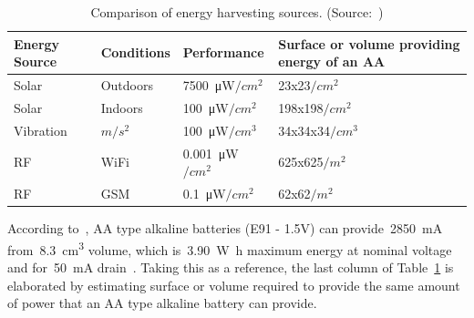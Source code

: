 \documentclass[12pt, oneandhalf, chaparabic, sees, ms]{metu}
\begin{document}
\renewcommand{\arraystretch}{1}%
\begin{table}[H]
\begin{center}
\caption{Comparison of energy harvesting sources. (Source:~\cite{akbari2014})}
\label{tab:harvesting-sources}
\begin{adjustbox}{max width=\textwidth}
\begin{tabular}{| >{\centering}m{3cm} | >{\centering}m{3cm} | >{\centering}m{3cm} | >{\centering}m{4cm} |}
\hline
\rowcolor{lightgray}
\textbf{Energy Source} & \textbf{Conditions} & \textbf{Performance} & \textbf{Surface or volume providing energy of an AA} \tabularnewline
\hline \hline
Solar     & Outdoors &  \SI{7500}{\micro\watt}$/cm^2$  &  23x23$/cm^2$    \tabularnewline \hline
Solar     & Indoors  &  \SI{100}{\micro\watt}$/cm^2$   &  198x198$/cm^2$  \tabularnewline \hline
Vibration & 1$m/s^2$ &  \SI{100}{\micro\watt}$/cm^3$   &  34x34x34$/cm^3$ \tabularnewline \hline 
RF        & WiFi     &  \SI{0.001}{\micro\watt}$/cm^2$ &  625x625$/m^2$   \tabularnewline \hline
RF        & GSM      &  \SI{0.1}{\micro\watt}$/cm^2$   &  62x62$/m^2$     \tabularnewline \hline
\end{tabular}
\end{adjustbox}
\end{center}
\end{table}
\renewcommand{\arraystretch}{1}%
% 
%
%
According to~\cite{knight2008, energizere91}, AA type alkaline batteries (E91 - 1.5V) can provide~\SI{2850}{\milli\ampere} from~\SI{8.3}{cm^3} volume, which is~\SI{3.90}{\watt\hour} 
maximum energy at nominal voltage and for~\SI{50}{\milli\ampere} drain~\cite{wiki-batteries}.
Taking this as a reference, the last column of Table~\ref{tab:harvesting-sources} is elaborated by estimating surface or volume required to provide the same amount of power that an AA type alkaline battery can provide. 
 
\end{document}
